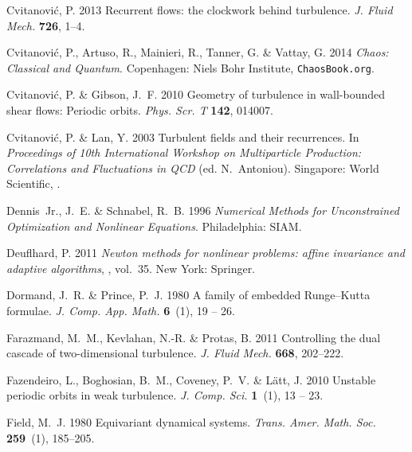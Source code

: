 \documentclass{article}
\begin{document}
\begin{thebibliography}{68}
{\sc Cvitanovi{\'c}, P.} 2013 Recurrent flows: the clockwork behind turbulence.
  {\em J. Fluid Mech.\/} {\bf 726}, 1--4.

{\sc Cvitanovi\'{c}, P., Artuso, R., Mainieri, R., Tanner, G. \& Vattay, G.}
  2014 {\em Chaos: Classical and Quantum\/}. Copenhagen: Niels Bohr Institute,
  {\tt ChaosBook.org}.

{\sc Cvitanovi{\'c}, P. \& Gibson, J.~F.} 2010 Geometry of turbulence in
  wall-bounded shear flows: {Periodic} orbits. {\em Phys. Scr. T\/} {\bf 142},
  014007.

{\sc Cvitanovi\'{c}, P. \& Lan, Y.} 2003 Turbulent fields and their
  recurrences. In {\em Proceedings of 10th International Workshop on
  Multiparticle Production: Correlations and Fluctuations in QCD\/} (ed.
  N.~Antoniou). Singapore: World Scientific, .

{\sc Dennis~Jr., J.~E. \& Schnabel, R.~B.} 1996 {\em Numerical Methods for
  Unconstrained Optimization and Nonlinear Equations\/}. Philadelphia: SIAM.

{\sc Deuflhard, P.} 2011 {\em Newton methods for nonlinear problems: affine
  invariance and adaptive algorithms\/}, , vol.~35. New York: Springer.

{\sc Dormand, J.~R. \& Prince, P.~J.} 1980 A family of embedded
  {R}unge--{K}utta formulae. {\em J. Comp. App. Math.\/} {\bf 6}~(1), 19 -- 26.

{\sc Farazmand, M.~M., Kevlahan, N.-R. \& Protas, B.} 2011 Controlling the dual
  cascade of two-dimensional turbulence. {\em J. Fluid Mech.\/} {\bf 668},
  202--222.

{\sc Fazendeiro, L., Boghosian, B.~M., Coveney, P.~V. \& L{\"a}tt, J.} 2010
  Unstable periodic orbits in weak turbulence. {\em J. Comp. Sci.\/} {\bf
  1}~(1), 13 -- 23.

{\sc Field, M.~J.} 1980 Equivariant dynamical systems. {\em Trans. Amer. Math.
  Soc.\/} {\bf 259}~(1), 185--205.


\end{thebibliography}
\end{document}
